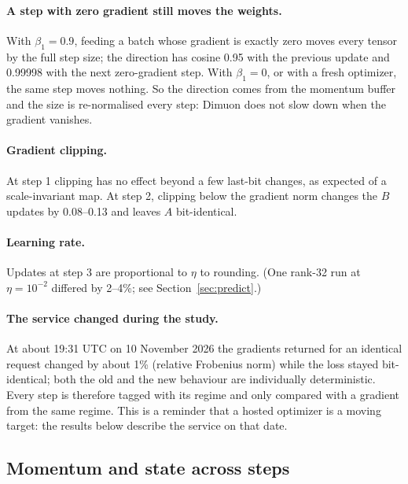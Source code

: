 \documentclass[11pt]{article}
\begin{document}
\paragraph{A step with zero gradient still moves the weights.} With $\beta_1=0.9$, feeding a
batch whose gradient is exactly zero moves every tensor by the full step size; the direction
has cosine 0.95 with the previous update and 0.99998 with the next zero-gradient step. With
$\beta_1=0$, or with a fresh optimizer, the same step moves nothing. So the direction comes
from the momentum buffer and the size is re-normalised every step: Dimuon does not slow down
when the gradient vanishes.

\paragraph{Gradient clipping.} At step 1 clipping has no effect beyond a few last-bit changes,
as expected of a scale-invariant map. At step 2, clipping below the gradient norm changes the
$B$ updates by 0.08--0.13 and leaves $A$ bit-identical.

\paragraph{Learning rate.} Updates at step 3 are proportional to $\eta$ to rounding. (One
rank-32 run at $\eta=10^{-2}$ differed by 2--4\%; see Section~\ref{sec:predict}.)

\paragraph{The service changed during the study.} At about 19:31 UTC on 10 November 2026 the
gradients returned for an identical request changed by about 1\% (relative Frobenius norm)
while the loss stayed bit-identical; both the old and the new behaviour are individually
deterministic. Every step is therefore tagged with its regime and only compared with a
gradient from the same regime. This is a reminder that a hosted optimizer is a moving target:
the results below describe the service on that date.

\subsection{Momentum and state across steps}\label{sec:rule}
\end{document}
